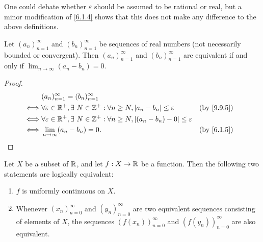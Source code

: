 \begin{rmk}\label{9.9.6}
  One could debate whether \(\varepsilon\) should be assumed to be rational or real, but a minor modification of \cref{6.1.4} shows that this does not make any difference to the above definitions.
\end{rmk}

\begin{lem}\label{9.9.7}
  Let \((a_n)_{n = 1}^\infty\) and \((b_n)_{n = 1}^\infty\) be sequences of real numbers
  (not necessarily bounded or convergent).
  Then \((a_n)_{n = 1}^\infty\) and \((b_n)_{n = 1}^\infty\) are equivalent if and only if \(\lim_{n \to \infty} (a_n - b_n) = 0\).
\end{lem}

\begin{proof}
  \begin{align*}
         & (a_n)_{n = 1}^\infty = (b_n)_{n = 1}^\infty                                                                                                \\
    \iff & \forall \varepsilon \in \R^+, \exists\ N \in \Z^+ : \forall n \geq N, \abs{a_n - b_n} \leq \varepsilon       &  & \text{(by \cref{9.9.5})} \\
    \iff & \forall \varepsilon \in \R^+, \exists\ N \in \Z^+ : \forall n \geq N, \abs{(a_n - b_n) - 0} \leq \varepsilon                               \\
    \iff & \lim_{n \to \infty} (a_n - b_n) = 0.                                                                         &  & \text{(by \cref{6.1.5})}
  \end{align*}
\end{proof}

\begin{prop}\label{9.9.8}
  Let \(X\) be a subset of \(\mathbb{R}\), and let \(f : X \to \mathbb{R}\) be a function.
  Then the following two statements are logically equivalent:
  \begin{enumerate}
    \item \(f\) is uniformly continuous on \(X\).
    \item Whenever \((x_n)_{n = 0}^\infty\) and \((y_n)_{n = 0}^\infty\) are two equivalent sequences consisting of elements of \(X\), the sequences \((f(x_n))_{n = 0}^\infty\) and \((f(y_n))_{n = 0}^\infty\) are also equivalent.
  \end{enumerate}
\end{prop}

